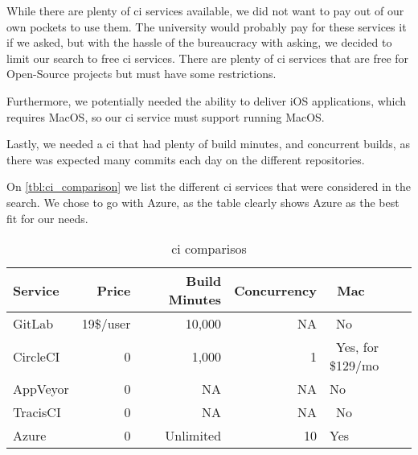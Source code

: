 While there are plenty of \gls{ci} services available, we did not want to pay out of our own pockets to use them. The university would probably pay for these services it if we asked, but with the hassle of the bureaucracy with asking, we decided to limit our search to free \gls{ci} services. There are plenty of \gls{ci} services that are free for Open-Source projects but must have some restrictions.

Furthermore, we potentially needed the ability to deliver iOS applications, which requires MacOS, so our \gls{ci} service must support running MacOS. 

Lastly, we needed a \gls{ci} that had plenty of build minutes, and concurrent builds, as there was expected many commits each day on the different repositories.

On \autoref{tbl:ci_comparison} we list the different \gls{ci} services that were considered in the search. We chose to go with Azure, as the table clearly shows Azure as the best fit for our needs.

\noindent\begin{longtable}[]{@{}lrrrl@{}}
    \caption{\gls{ci} comparisos}
    \label{tbl:ci_comparison}\\
    \toprule
    Service & Price & ~Build Minutes & Concurrency & ~Mac\tabularnewline
    \midrule
    \endhead
    GitLab & 19\$/user & 10,000 & NA & ~No\tabularnewline
    CircleCI & 0 & 1,000 & 1 & ~Yes, for \$129/mo\tabularnewline
    AppVeyor & 0 & ~ NA & NA & No\tabularnewline
    TracisCI & ~ 0 & ~ NA & ~ NA & ~No ~\tabularnewline
    Azure & 0 & ~ Unlimited & ~10 & Yes\tabularnewline
    \bottomrule
\end{longtable}
